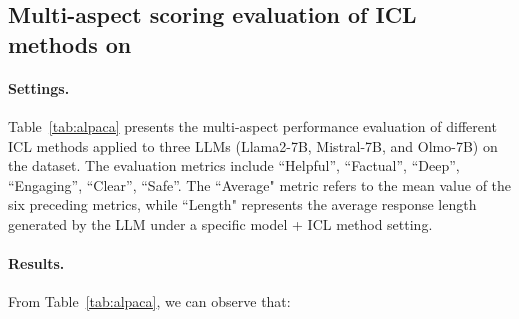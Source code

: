 \subsection{Multi-aspect scoring evaluation of ICL methods on \alpaca{}}
\label{append:alpaca_all_discuss}


\paragraph{Settings.} Table~\ref{tab:alpaca} presents the multi-aspect performance evaluation of different ICL methods applied to three LLMs (Llama2-7B, Mistral-7B, and Olmo-7B) on the \alpaca{} dataset. The evaluation metrics include ``Helpful'', ``Factual'', ``Deep'', ``Engaging'', ``Clear'', ``Safe''.
The ``Average" metric refers to the mean value of the six preceding metrics, while ``Length" represents the average response length generated by the LLM under a specific model + ICL method setting.


\paragraph{Results.} From Table~\ref{tab:alpaca}, we can observe that:

